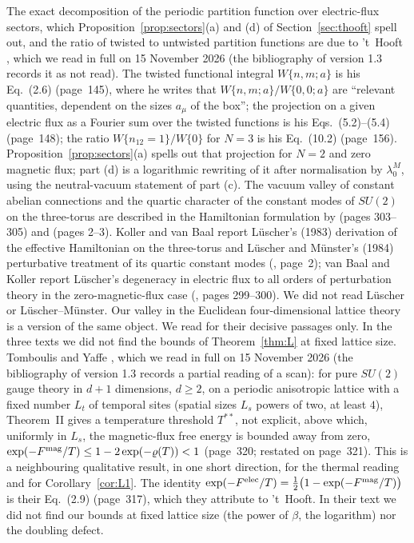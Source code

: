 \documentclass[11pt,a4paper]{article}
\theoremstyle{plain}
\theoremstyle{definition}
\theoremstyle{remark}
\numberwithin{equation}{section}
\begin{document}
 The exact decomposition of the periodic partition function over electric-flux sectors, which Proposition~\ref{prop:sectors}(a) and (d) of Section~\ref{sec:thooft} spell out, and the ratio of twisted to untwisted partition functions are due to 't~Hooft \cite{tH79}, which we read in full on 15 November 2026 (the bibliography of version 1.3 records it as not read). The twisted functional integral $W\{n,m;a\}$ is his Eq.~(2.6) (page~145), where he writes that $W\{n,m;a\}/W\{0,0;a\}$ are ``relevant quantities, dependent on the sizes $a_\mu$ of the box''; the projection on a given electric flux as a Fourier sum over the twisted functions is his Eqs.~(5.2)--(5.4) (page~148); the ratio $W\{n_{12}=1\}/W\{0\}$ for $N=3$ is his Eq.~(10.2) (page~156). Proposition~\ref{prop:sectors}(a) spells out that projection for $N=2$ and zero magnetic flux; part (d) is a logarithmic rewriting of it after normalisation by $\lambda_0^M$, using the neutral-vacuum statement of part (c). The vacuum valley of constant abelian connections and the quartic character of the constant modes of $SU(2)$ on the three-torus are described in the Hamiltonian formulation by \cite{vBK87} (pages 303--305) and \cite{KvB88} (pages 2--3). Koller and van Baal report L\"uscher's (1983) derivation of the effective Hamiltonian on the three-torus and L\"uscher and M\"unster's (1984) perturbative treatment of its quartic constant modes (\cite{KvB88}, page~2); van Baal and Koller report L\"uscher's degeneracy in electric flux to all orders of perturbation theory in the zero-magnetic-flux case (\cite{vBK87}, pages 299--300). We did not read L\"uscher or L\"uscher--M\"unster. Our valley in the Euclidean four-dimensional lattice theory is a version of the same object. We read \cite{vBK87,KvB88} for their decisive passages only. In the three texts we did not find the bounds of Theorem~\ref{thm:L} at fixed lattice size.
 Tomboulis and Yaffe \cite{TY85}, which we read in full on 15 November 2026 (the bibliography of version 1.3 records a partial reading of a scan): for pure $SU(2)$ gauge theory in $d+1$ dimensions, $d\ge2$, on a periodic anisotropic lattice with a fixed number $L_t$ of temporal sites (spatial sizes $L_s$ powers of two, at least $4$), Theorem~II gives a temperature threshold $T^{**}$, not explicit, above which, uniformly in $L_s$, the magnetic-flux free energy is bounded away from zero, $\exp(-F^{\rm mag}/T)\le1-2\exp(-\varrho(T))<1$ (page~320; restated on page~321). This is a neighbouring qualitative result, in one short direction, for the thermal reading and for Corollary~\ref{cor:L1}. The identity $\exp(-F^{\rm elec}/T)=\tfrac12\bigl(1-\exp(-F^{\rm mag}/T)\bigr)$ is their Eq.~(2.9) (page~317), which they attribute to 't~Hooft. In their text we did not find our bounds at fixed lattice size (the power of $\beta$, the logarithm) nor the doubling defect.
\end{document}
